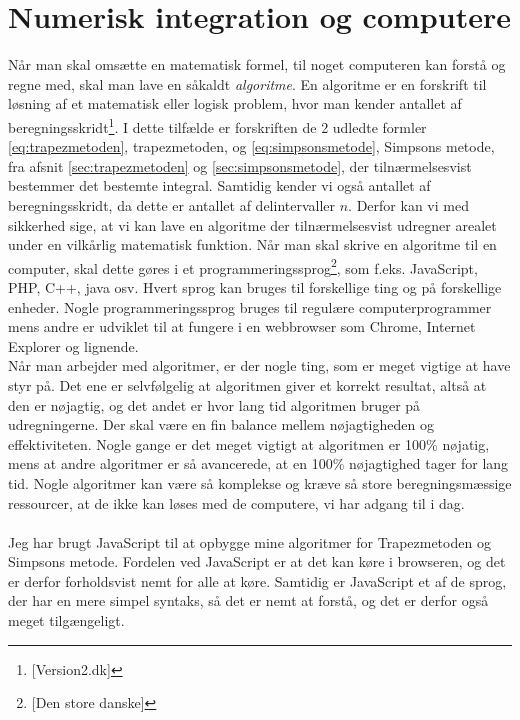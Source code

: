 \documentclass[12pt]{article}
\numberwithin{equation}{section}
\begin{document}
\pagebreak
\section{Numerisk integration og computere}
Når man skal omsætte en matematisk formel, til noget computeren kan forstå og regne med, skal man lave en såkaldt \emph{algoritme}. En algoritme er en forskrift til løsning af et matematisk eller logisk problem, hvor man kender antallet af beregningsskridt\footnote{\cite{version2:algoritme}[Version2.dk]}. I dette tilfælde er forskriften de 2 udledte formler \eqref{eq:trapezmetoden}, trapezmetoden, og \eqref{eq:simpsonsmetode}, Simpsons metode, fra afsnit \ref{sec:trapezmetoden} og \ref{sec:simpsonsmetode}, der tilnærmelsesvist bestemmer det bestemte integral. Samtidig kender vi også antallet af beregningsskridt, da dette er antallet af delintervaller $n$. Derfor kan vi med sikkerhed sige, at vi kan lave en algoritme der tilnærmelsesvist udregner arealet under en vilkårlig matematisk funktion.
Når man skal skrive en algoritme til en computer, skal dette gøres i et programmeringssprog\footnote{\cite{denstoredanske:algoritme}[Den store danske]}, som f.eks. JavaScript, PHP, C++, java osv. Hvert sprog kan bruges til forskellige ting og på forskellige enheder. Nogle programmeringssprog bruges til regulære computerprogrammer mens andre er udviklet til at fungere i en webbrowser som Chrome, Internet Explorer og lignende.
\\
Når man arbejder med algoritmer, er der nogle ting, som er meget vigtige at have styr på. Det ene er selvfølgelig at algoritmen giver et korrekt resultat, altså at den er nøjagtig, og det andet er hvor lang tid algoritmen bruger på udregningerne. Der skal være en fin balance mellem nøjagtigheden og effektiviteten. Nogle gange er det meget vigtigt at algoritmen er 100\% nøjatig, mens at andre algoritmer er så avancerede, at en 100\% nøjagtighed tager for lang tid. Nogle algoritmer kan være så komplekse og kræve så store beregningsmæssige ressourcer, at de ikke kan løses med de computere, vi har adgang til i dag.
\\\\
Jeg har brugt JavaScript til at opbygge mine algoritmer for Trapezmetoden og Simpsons metode. Fordelen ved JavaScript er at det kan køre i browseren, og det er derfor forholdsvist nemt for alle at køre. Samtidig er JavaScript et af de sprog, der har en mere simpel syntaks, så det er nemt at forstå, og det er derfor også meget tilgængeligt.
\end{document}
